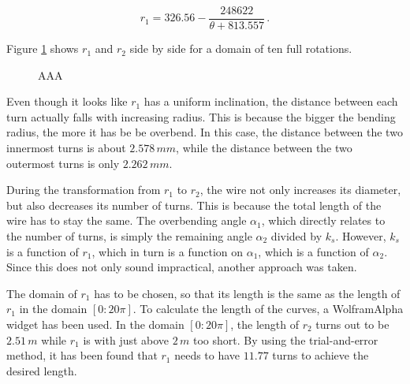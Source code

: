 \begin{equation}
    r_1 = 326.56 - \frac{248622}{\theta + 813.557}\,.
\end{equation}

Figure \ref{fig:spirals} shows \(r_1\) and \(r_2\) side by side for a domain of ten full rotations.

\begin{figure}[h!]
    \centering
    \caption{AAA}
    \label{fig:spirals}
\end{figure}

Even though it looks like \(r_1\) has a uniform inclination, the distance between each turn actually falls with increasing radius. This is because the bigger the bending radius, the more it has be be overbend. In this case, the distance between the two innermost turns is about \(2.578\,mm\), while the distance between the two outermost turns is only \(2.262\,mm\).

During the transformation from \(r_1\) to \(r_2\), the wire not only increases its diameter, but also decreases its number of turns. This is because the total length of the wire has to stay the same. The overbending angle \(\alpha_1\), which directly relates to the number of turns, is simply the remaining angle \(\alpha_2\) divided by \(k_s\). However, \(k_s\) is a function of \(r_1\), which in turn is a function on \(\alpha_1\), which is a function of \(\alpha_2\). Since this does not only sound impractical, another approach was taken.

The domain of \(r_1\) has to be chosen, so that its length is the same as the length of \(r_1\) in the domain \([0:20\pi]\). To calculate the length of the curves, a WolframAlpha widget has been used. In the domain \([0:20\pi]\), the length of \(r_2\) turns out to be \(2.51\,m\) while \(r_1\) is with just above \(2\,m\) too short. By using the trial-and-error method, it has been found that \(r_1\) needs to have \(11.77\) turns to achieve the desired length.

